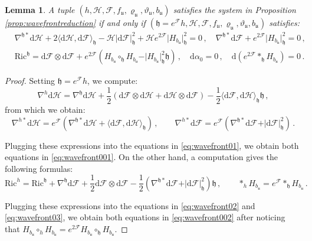 \documentclass[10pt,a4paper,twoside,reqno]{amsart}
\theoremstyle{plain}
\newtheorem{lemma}[thm]{Lemma}
\theoremstyle{definition}
\theoremstyle{remark}
\def\dd{\mathrm{d}}
\def\cH{\mathcal{H}}
\def\cF{\mathcal{F}}
\def\cH{\mathcal{H}}
\def\dd{\mathrm{d}}
\def\fru{\mathfrak{u}}
\begin{document}
\begin{lemma}
\label{lemma:conformaltrans}
A tuple $(h,\cH,\cF, f_{\fru} , \varrho_{\fru}, \vartheta_{\fru} , b_{\fru})$ satisfies the system in Proposition \ref{prop:wavefrontreduction} if and only if $(\mathfrak{h} = e^{\cF}h,\cH,\cF, f_{\fru} , \varrho_{\fru}, \vartheta_{\fru} , b_{\fru})$ satisfies:
\begin{eqnarray}
& \nabla^{\mathfrak{h}\ast} \dd\cH + 2\langle \dd\cH, \dd\cF \rangle_{\mathfrak{h}} -   \cH \vert \dd\cF \vert^2_{\mathfrak{h}}  +  \cH e^{2\cF} \vert H_{b_{\fru}} \vert^2_{\mathfrak{h}} = 0\, , \quad  \nabla^{\mathfrak{h}\ast}\dd \cF  +   e^{2\cF} \vert H_{b_{\fru}} \vert^2_{\mathfrak{h}} = 0\, ,\label{eq:wavefront001}\\
& \mathrm{Ric}^{\mathfrak{h}} = \dd\cF \otimes \dd\cF +   e^{2\cF} (H_{b_{\fru}}\circ_{\mathfrak{h}} H_{b_{\fru}} -  \vert H_{b_{\fru}} \vert^2_{\mathfrak{h}}\mathfrak{h} )\, , \quad \dd\alpha_{0} = 0\, ,  \quad \dd (e^{2\cF} \ast_{\mathfrak{h}} H_{b_{\fru}}) = 0\, .\label{eq:wavefront002}
\end{eqnarray}
\end{lemma}

\begin{proof}
Setting $\mathfrak{h} = e^{\cF} h$, we compute:
\begin{equation*}
\nabla^{h} \dd\cH = \nabla^{\mathfrak{h}}\dd \cH + \frac{1}{2} (\dd\cF \otimes \dd\cH + \dd\cH \otimes \dd\cF) - \frac{1}{2} \langle \dd\cF ,\dd\cH\rangle_{\mathfrak{h}} \mathfrak{h}\, ,
\end{equation*}
from which we obtain:
\begin{equation*}
\nabla^{h\ast}\dd\cH = e^{\cF} (\nabla^{\mathfrak{h}\ast}\dd\cH  + \langle \dd\cF , \dd\cH \rangle_{\mathfrak{h}})\, , \qquad \nabla^{h\ast}\dd\cF = e^{\cF} (\nabla^{\mathfrak{h}\ast}\dd\cF  + \vert \dd\cF\vert^2_{\mathfrak{h}})\, .
\end{equation*}

\noindent
Plugging these expressions into the equations in \eqref{eq:wavefront01}, we obtain both equations in \eqref{eq:wavefront001}. On the other hand, a computation gives the following formulas:
\begin{equation*}
\mathrm{Ric}^{h} =  \mathrm{Ric}^{\mathfrak{h}} + \nabla^{\mathfrak{h}}\dd\cF + \frac{1}{2} \dd\cF \otimes \dd\cF - \frac{1}{2} (\nabla^{\mathfrak{h}\ast}\dd\cF + \vert \dd\cF\vert^2_{\mathfrak{h}}) \mathfrak{h}\, , \qquad \ast_h H_{b_{\fru}} = e^{\cF}  \ast_{\mathfrak{h}} H_{b_{\fru}}\, .
\end{equation*}

\noindent
Plugging these expressions into the equations in \eqref{eq:wavefront02} and \eqref{eq:wavefront03}, we obtain both equations in \eqref{eq:wavefront002} after noticing that $H_{b_{\fru}}\circ_h H_{b_{\fru}} =  e^{2\cF}   H_{b_{\fru}}\circ_{\mathfrak{h}} H_{b_{\fru}}$.
\end{proof}
\end{document}
